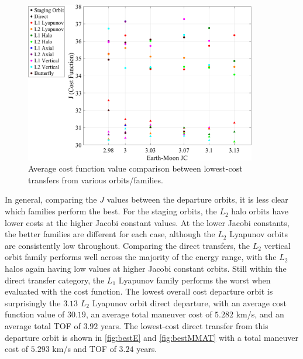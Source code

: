 \begin{figure}[!htb]
    \centering
    \includegraphics[width=0.9\textwidth]{figures/JComparison.pdf}
    \caption{Average cost function value comparison between lowest-cost transfers from various orbits/families.}
    \label{fig:compareJ}
\end{figure}

In general, comparing the $J$ values between the departure orbits, it is less clear which families
perform the best. For the staging orbits, the $L_{2}$ halo orbits have lower costs at the higher
Jacobi constant values. At the lower Jacobi constants, the better families are different for each
case, although the $L_{2}$ Lyapunov orbits are consistently low throughout. Comparing the direct
transfers, the $L_{2}$ vertical orbit family performs well across the majority of the energy range,
with the $L_{2}$ halos again having low values at higher Jacobi constant orbits. Still within the
direct transfer category, the $L_{1}$ Lyapunov family performs the worst when evaluated with the
cost function. The lowest overall cost departure orbit is surprisingly the $3.13$ $L_{2}$ Lyapunov
orbit direct departure, with an average cost function value of $30.19$, an average total maneuver
cost of $5.282$ km/s, and an average total TOF of $3.92$ years. The lowest-cost direct transfer
from this departure orbit is shown in \cref{fig:bestE} and \cref{fig:bestMMAT} with a total
maneuver cost of $5.293$ km/s and TOF of $3.24$ years.

